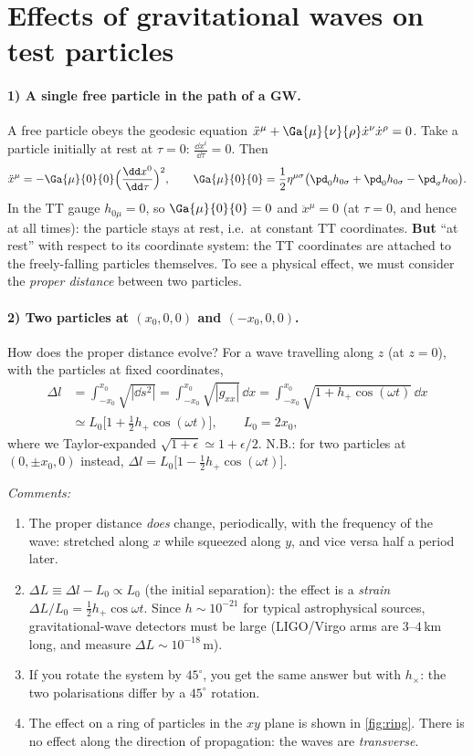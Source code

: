 \section{Effects of gravitational waves on test particles}

\paragraph{1) A single free particle in the path of a GW.} A free particle obeys the geodesic equation $\ddot x^\mu+\Ga{\mu}{\nu}{\rho}\dot x^\nu\dot x^\rho=0$. Take a particle initially at rest at $\tau=0$: $\frac{\dd x^i}{\dd\tau}=0$. Then
\[
  \ddot x^\mu=-\Ga{\mu}{0}{0}\Big(\frac{\dd x^0}{\dd\tau}\Big)^2,\qquad\Ga{\mu}{0}{0}=\frac12\eta^{\mu\sigma}\big(\pd_0h_{0\sigma}+\pd_0h_{0\sigma}-\pd_\sigma h_{00}\big).
\]
In the TT gauge $h_{0\mu}=0$, so $\Ga{\mu}{0}{0}=0$ and $\ddot x^\mu=0$ (at $\tau=0$, and hence at all times): the particle stays at rest, i.e.\ at constant TT coordinates. \textbf{But} ``at rest'' with respect to its coordinate system: the TT coordinates are attached to the freely-falling particles themselves. To see a physical effect, we must consider the \emph{proper distance} between two particles.

\paragraph{2) Two particles at $(x_0,0,0)$ and $(-x_0,0,0)$.} How does the proper distance evolve? For a wave travelling along $z$ (at $z=0$), with the particles at fixed coordinates,
\begin{align}
  \Delta l&=\int_{-x_0}^{x_0}\sqrt{|\dd s^2|}=\int_{-x_0}^{x_0}\sqrt{|g_{xx}|}\,\dd x=\int_{-x_0}^{x_0}\sqrt{1+h_+\cos(\omega t)}\,\dd x\nonumber\\
  &\simeq L_0\Big[1+\frac12h_+\cos(\omega t)\Big],\qquad L_0=2x_0,
\end{align}
where we Taylor-expanded $\sqrt{1+\epsilon}\simeq1+\epsilon/2$. N.B.: for two particles at $(0,\pm x_0,0)$ instead, $\Delta l=L_0\big[1-\frac12h_+\cos(\omega t)\big]$.

\textit{Comments:}
\begin{enumerate}
\item The proper distance \emph{does} change, periodically, with the frequency of the wave: stretched along $x$ while squeezed along $y$, and vice versa half a period later.
\item $\Delta L\equiv\Delta l-L_0\propto L_0$ (the initial separation): the effect is a \emph{strain} $\Delta L/L_0=\frac12h_+\cos\omega t$. Since $h\sim10^{-21}$ for typical astrophysical sources, gravitational-wave detectors must be large (LIGO/Virgo arms are $3$--$4$\,km long, and measure $\Delta L\sim10^{-18}$\,m).
\item If you rotate the system by $45^\circ$, you get the same answer but with $h_\times$: the two polarisations differ by a $45^\circ$ rotation.
\item The effect on a ring of particles in the $xy$ plane is shown in \cref{fig:ring}. There is no effect along the direction of propagation: the waves are \emph{transverse}.
\end{enumerate}

